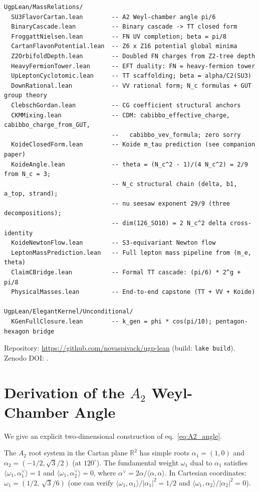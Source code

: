 \documentclass[11pt]{article}
\theoremstyle{remark}
\begin{document}
\begin{small}
\begin{verbatim}
UgpLean/MassRelations/
  SU3FlavorCartan.lean        -- A2 Weyl-chamber angle pi/6
  BinaryCascade.lean          -- Binary cascade -> TT closed form
  FroggattNielsen.lean        -- FN UV completion; beta = pi/8
  CartanFlavonPotential.lean  -- Z6 x Z16 potential global minima
  Z2OrbifoldDepth.lean        -- Doubled FN charges from Z2-tree depth
  HeavyFermionTower.lean      -- EFT duality: FN = heavy-fermion tower
  UpLeptonCyclotomic.lean     -- TT scaffolding; beta = alpha/C2(SU3)
  DownRational.lean           -- VV rational form; N_c formulas + GUT group theory
  ClebschGordan.lean          -- CG coefficient structural anchors
  CKMMixing.lean              -- CDM: cabibbo_effective_charge, cabibbo_charge_from_GUT,
                              --   cabibbo_vev_formula; zero sorry
  KoideClosedForm.lean        -- Koide m_tau prediction (see companion paper)
  KoideAngle.lean             -- theta = (N_c^2 - 1)/(4 N_c^2) = 2/9 from N_c = 3;
                              -- N_c structural chain (delta, b1, a_top, strand);
                              -- nu seesaw exponent 29/9 (three decompositions);
                              -- dim(126_SO10) = 2 N_c^2 delta cross-identity
  KoideNewtonFlow.lean        -- S3-equivariant Newton flow
  LeptonMassPrediction.lean   -- Full lepton mass pipeline from (m_e, theta)
  ClaimCBridge.lean           -- Formal TT cascade: (pi/6) * 2^g + pi/8
  PhysicalMasses.lean         -- End-to-end capstone (TT + VV + Koide)

UgpLean/ElegantKernel/Unconditional/
  KGenFullClosure.lean        -- k_gen = phi * cos(pi/10); pentagon-hexagon bridge
\end{verbatim}
\end{small}

Repository: \url{https://github.com/novaspivack/ugp-lean}
(build: \texttt{lake build}).
Zenodo DOI: \cite{ugp-lean}.

\section{Derivation of the $A_2$ Weyl-Chamber Angle}
\label{app:a2}

We give an explicit two-dimensional construction of eq.~\eqref{eq:A2_angle}.

The $A_2$ root system in the Cartan plane $\mathbb{R}^2$ has simple roots
$\alpha_1=(1,0)$ and $\alpha_2=(-1/2,\sqrt{3}/2)$ (at $120^\circ$).
The fundamental weight $\omega_1$ dual to $\alpha_1$ satisfies
$\langle\omega_1,\alpha_1^\vee\rangle=1$ and $\langle\omega_1,\alpha_2^\vee\rangle=0$,
where $\alpha^\vee = 2\alpha/\langle\alpha,\alpha\rangle$.
In Cartesian coordinates: $\omega_1 = (1/2,\,\sqrt{3}/6)$
(one can verify $\langle\omega_1,\alpha_1\rangle/|\alpha_1|^2=1/2$
and $\langle\omega_1,\alpha_2\rangle/|\alpha_2|^2=0$).
\end{document}
